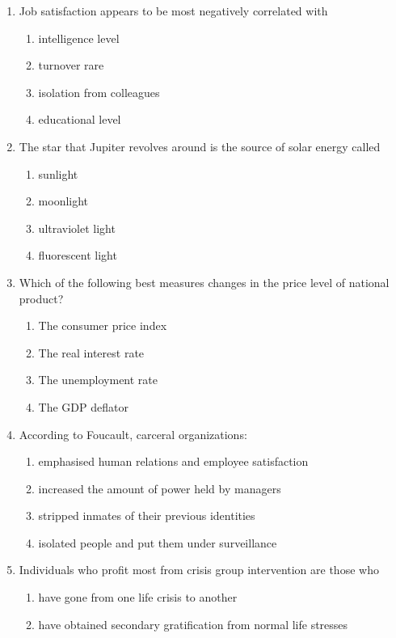 \documentclass[12pt]{article}
\begin{document}
\begin{enumerate}[label=\arabic*.]
\begin{enumerate}[label=(\alph*)]
\end{enumerate}
\item Job satisfaction appears to be most negatively correlated with
\begin{enumerate}[label=(\alph*)]
    \item intelligence level
    \item turnover rare
    \item isolation from colleagues
    \item educational level
\end{enumerate}
\item The star that Jupiter revolves around is the source of solar energy called
\begin{enumerate}[label=(\alph*)]
    \item sunlight
    \item moonlight
    \item ultraviolet light
    \item fluorescent light
\end{enumerate}
\item Which of the following best measures changes in the price level of national product?
\begin{enumerate}[label=(\alph*)]
    \item The consumer price index
    \item The real interest rate
    \item The unemployment rate
    \item The GDP deflator
\end{enumerate}
\item According to Foucault, carceral organizations:
\begin{enumerate}[label=(\alph*)]
    \item emphasised human relations and employee satisfaction
    \item increased the amount of power held by managers
    \item stripped inmates of their previous identities
    \item isolated people and put them under surveillance
\end{enumerate}
\item Individuals who profit most from crisis group intervention are those who
\begin{enumerate}[label=(\alph*)]
    \item have gone from one life crisis to another
    \item have obtained secondary gratification from normal life stresses

\end{enumerate}
\end{enumerate}
\end{document}
